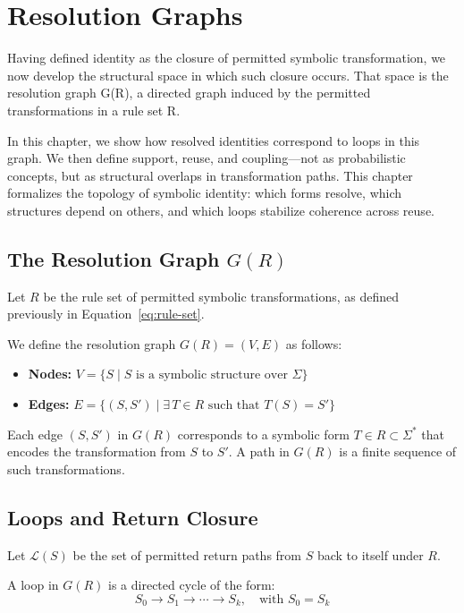 \chapter{Resolution Graphs}

Having defined identity as the closure of permitted symbolic
transformation, we now develop the structural space in which such
closure occurs. That space is the resolution graph G(R), a directed
graph induced by the permitted transformations in a rule set R.

In this chapter, we show how resolved identities correspond to loops in
this graph. We then define support, reuse, and coupling---not as
probabilistic concepts, but as structural overlaps in transformation
paths. This chapter formalizes the topology of symbolic identity: which
forms resolve, which structures depend on others, and which loops
stabilize coherence across reuse.

\section{The Resolution Graph $G(R)$}

Let $R$ be the rule set of permitted symbolic transformations, as defined previously in Equation~\ref{eq:rule-set}.
\begin{definition} \label{def:resolution-graph}
We define the resolution graph $G(R) = (V, E)$ as follows:
\begin{itemize}
  \item \textbf{Nodes:} $V = \{ S \mid S \text{ is a symbolic structure over } \Sigma \}$
  \item \textbf{Edges:} $E = \{ (S, S') \mid \exists\, T \in R \text{ such that } T(S) = S' \}$
\end{itemize}
\end{definition}

Each edge $(S, S')$ in $G(R)$ corresponds to a symbolic form $T \in R \subset \Sigma^*$ that encodes the transformation from $S$ to $S'$.  
A path in $G(R)$ is a finite sequence of such transformations.

\section{Loops and Return Closure}

Let $\mathcal{L}(S)$ be the set of permitted return paths from $S$ back to itself under $R$.

A loop in $G(R)$ is a directed cycle of the form:
\[
S_0 \rightarrow S_1 \rightarrow \cdots \rightarrow S_k, \quad \text{with } S_0 = S_k
\]


